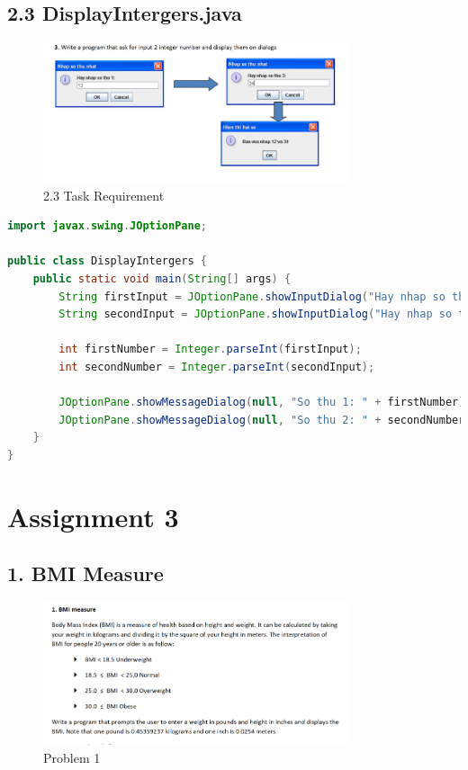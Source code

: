 \documentclass{article}
\begin{document}
\subsection*{2.3 DisplayIntergers.java}

\begin{figure}[H]
    \centering
    \includegraphics[width=0.8\textwidth]{./Assets/Task requirements/Assignment2/3.png}
    \caption{2.3 Task Requirement}
\end{figure}

\begin{lstlisting}[language=Java, caption=DisplayIntergers.java]
import javax.swing.JOptionPane;

public class DisplayIntergers {
    public static void main(String[] args) {
        String firstInput = JOptionPane.showInputDialog("Hay nhap so thu 1:");
        String secondInput = JOptionPane.showInputDialog("Hay nhap so thu 2:");

        int firstNumber = Integer.parseInt(firstInput);
        int secondNumber = Integer.parseInt(secondInput);

        JOptionPane.showMessageDialog(null, "So thu 1: " + firstNumber);
        JOptionPane.showMessageDialog(null, "So thu 2: " + secondNumber);
    }
}
\end{lstlisting}

\section*{Assignment 3}

\subsection*{1. BMI Measure}
\begin{figure}[H]
    \centering
    \includegraphics[width=0.8\textwidth]{./Assets/Task requirements/Assignment3/1.png}
    \caption{Problem 1}
\end{figure}
\end{document}
